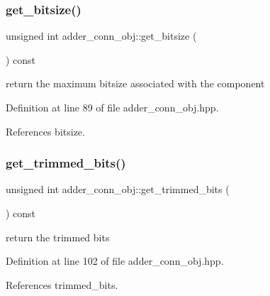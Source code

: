 \subsubsection{\texorpdfstring{get\+\_\+bitsize()}{get\_bitsize()}}
{\footnotesize\ttfamily unsigned int adder\+\_\+conn\+\_\+obj\+::get\+\_\+bitsize (\begin{DoxyParamCaption}{ }\end{DoxyParamCaption}) const\hspace{0.3cm}{\ttfamily [inline]}}



return the maximum bitsize associated with the component 



Definition at line 89 of file adder\+\_\+conn\+\_\+obj.\+hpp.



References bitsize.

\mbox{\label{classadder__conn__obj_a3f08ac2713ff4c20f2eca3b6f3f3020b}} 
\subsubsection{\texorpdfstring{get\+\_\+trimmed\+\_\+bits()}{get\_trimmed\_bits()}}
{\footnotesize\ttfamily unsigned int adder\+\_\+conn\+\_\+obj\+::get\+\_\+trimmed\+\_\+bits (\begin{DoxyParamCaption}{ }\end{DoxyParamCaption}) const\hspace{0.3cm}{\ttfamily [inline]}}



return the trimmed bits 



Definition at line 102 of file adder\+\_\+conn\+\_\+obj.\+hpp.



References trimmed\+\_\+bits.

\mbox{\label{classadder__conn__obj_ac3b31e89dd8e3114faac2cb3a609295c}} 
